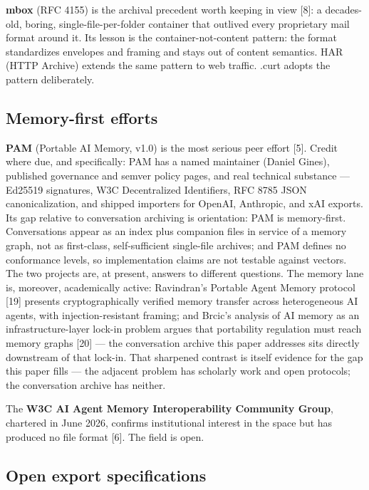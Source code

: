 \documentclass[11pt]{article}
\begin{document}
\textbf{mbox} (RFC 4155) is the archival precedent worth keeping in view [8]: a decades-old, boring, single-file-per-folder container that outlived every proprietary mail format around it. Its lesson is the container-not-content pattern: the format standardizes envelopes and framing and stays out of content semantics. HAR (HTTP Archive) extends the same pattern to web traffic. .curt adopts the pattern deliberately.

\subsection{Memory-first efforts}

\textbf{PAM} (Portable AI Memory, v1.0) is the most serious peer effort [5]. Credit where due, and specifically: PAM has a named maintainer (Daniel Gines), published governance and semver policy pages, and real technical substance --- Ed25519 signatures, W3C Decentralized Identifiers, RFC 8785 JSON canonicalization, and shipped importers for OpenAI, Anthropic, and xAI exports. Its gap relative to conversation archiving is orientation: PAM is memory-first. Conversations appear as an index plus companion files in service of a memory graph, not as first-class, self-sufficient single-file archives; and PAM defines no conformance levels, so implementation claims are not testable against vectors. The two projects are, at present, answers to different questions. The memory lane is, moreover, academically active: Ravindran's Portable Agent Memory protocol [19] presents cryptographically verified memory transfer across heterogeneous AI agents, with injection-resistant framing; and Brcic's analysis of AI memory as an infrastructure-layer lock-in problem argues that portability regulation must reach memory graphs [20] --- the conversation archive this paper addresses sits directly downstream of that lock-in. That sharpened contrast is itself evidence for the gap this paper fills --- the adjacent problem has scholarly work and open protocols; the conversation archive has neither.

The \textbf{W3C AI Agent Memory Interoperability Community Group}, chartered in June 2026, confirms institutional interest in the space but has produced no file format [6]. The field is open.

\subsection{Open export specifications}
\end{document}
